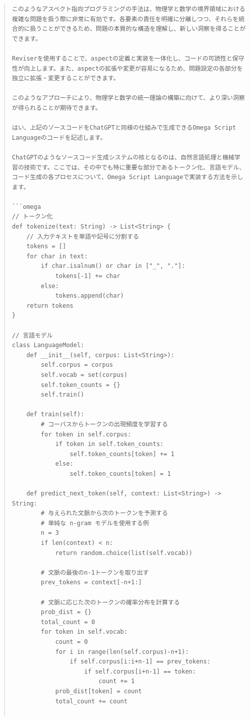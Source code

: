 \documentclass{jsarticle}
\begin{document}
\begin{quote}
\begin{verbatim}
このようなアスペクト指向プログラミングの手法は、物理学と数学の境界領域における複雑な問題を扱う際に非常に有効です。各要素の責任を明確に分離しつつ、それらを統合的に扱うことができるため、問題の本質的な構造を理解し、新しい洞察を得ることができます。

Reviserを使用することで、aspectの定義と実装を一体化し、コードの可読性と保守性が向上します。また、aspectの拡張や変更が容易になるため、問題設定の各部分を独立に拡張・変更することができます。

このようなアプローチにより、物理学と数学の統一理論の構築に向けて、より深い洞察が得られることが期待できます。

はい、上記のソースコードをChatGPTと同様の仕組みで生成できるOmega Script Languageのコードを記述します。

ChatGPTのようなソースコード生成システムの核となるのは、自然言語処理と機械学習の技術です。ここでは、その中でも特に重要な部分であるトークン化、言語モデル、コード生成の各プロセスについて、Omega Script Languageで実装する方法を示します。

```omega
// トークン化
def tokenize(text: String) -> List<String> {
    // 入力テキストを単語や記号に分割する
    tokens = []
    for char in text:
        if char.isalnum() or char in ["_", "."]:
            tokens[-1] += char
        else:
            tokens.append(char)
    return tokens
}

// 言語モデル
class LanguageModel:
    def __init__(self, corpus: List<String>):
        self.corpus = corpus
        self.vocab = set(corpus)
        self.token_counts = {}
        self.train()

    def train(self):
        # コーパスからトークンの出現頻度を学習する
        for token in self.corpus:
            if token in self.token_counts:
                self.token_counts[token] += 1
            else:
                self.token_counts[token] = 1

    def predict_next_token(self, context: List<String>) -> String:
        # 与えられた文脈から次のトークンを予測する
        # 単純な n-gram モデルを使用する例
        n = 3
        if len(context) < n:
            return random.choice(list(self.vocab))
        
        # 文脈の最後のn-1トークンを取り出す
        prev_tokens = context[-n+1:]
        
        # 文脈に応じた次のトークンの確率分布を計算する
        prob_dist = {}
        total_count = 0
        for token in self.vocab:
            count = 0
            for i in range(len(self.corpus)-n+1):
                if self.corpus[i:i+n-1] == prev_tokens:
                    if self.corpus[i+n-1] == token:
                        count += 1
            prob_dist[token] = count
            total_count += count
        

\end{verbatim}
\end{quote}
\end{document}
